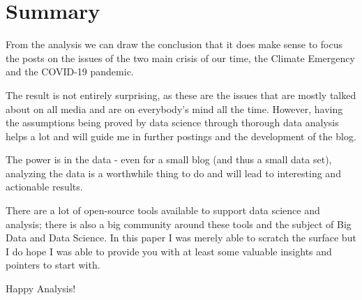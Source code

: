 %
%

\pagebreak
\section{Summary}

\onehalfspacing

From the analysis we can draw the conclusion that it does make sense to focus the posts on the issues of the two main crisis of our time, the Climate Emergency and the COVID-19 pandemic.

The result is not entirely surprising, as these are the issues that are mostly talked about on all media and are on everybody's mind all the time. However, having the assumptions being proved by data science through thorough data analysis helps a lot and will guide me in further postings and the development of the blog.

The power is in the data - even for a small blog (and thus a small data set), analyzing the data is a worthwhile thing to do and will lead to interesting and actionable results.

There are a lot of open-source tools available to support data science and analysis; there is also a big community around these tools and the subject of Big Data and Data Science. In this paper I was merely able to scratch the surface but I do hope I was able to provide you with at least some valuable insights and pointers to start with.

Happy Analysis!
